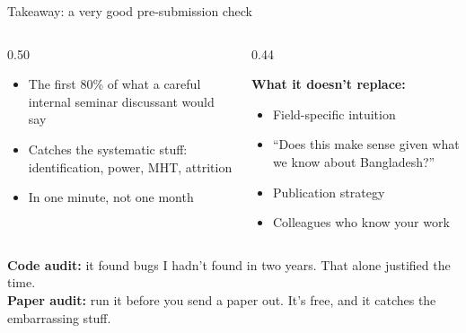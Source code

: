 \documentclass[aspectratio=169, 10pt]{beamer}
\begin{document}
\begin{frame}{Takeaway: a very good pre-submission check}
\begin{columns}[T]
\begin{column}{0.50\textwidth}
\begin{tcolorbox}[keybox, title={\faCheck\quad What It Replaces}]
\small
\begin{itemize}\setlength{\itemsep}{3pt}
  \item The first 80\% of what a careful internal seminar discussant would say
  \item Catches the systematic stuff: identification, power, MHT, attrition
  \item In one minute, not one month
\end{itemize}
\end{tcolorbox}
\end{column}
\begin{column}{0.44\textwidth}
\begin{tcolorbox}[colback=SoftCoral!8, colframe=SoftCoral, boxrule=0.5pt, arc=3pt,
  left=6pt, right=6pt, top=4pt, bottom=4pt]
\small
\textbf{What it doesn't replace:}
\vskip3pt
\begin{itemize}\setlength{\itemsep}{2pt}
  \item Field-specific intuition
  \item ``Does this make sense given what we know about Bangladesh?''
  \item Publication strategy
  \item Colleagues who know your work
\end{itemize}
\end{tcolorbox}
\end{column}
\end{columns}
\vskip8pt
\begin{tcolorbox}[quotebox, width=13cm]
\small \textbf{Code audit:} it found bugs I hadn't found in two years. That alone justified the time.\\[2pt]
\textbf{Paper audit:} run it before you send a paper out. It's free, and it catches the embarrassing stuff.
\end{tcolorbox}
\end{frame}
\end{document}
